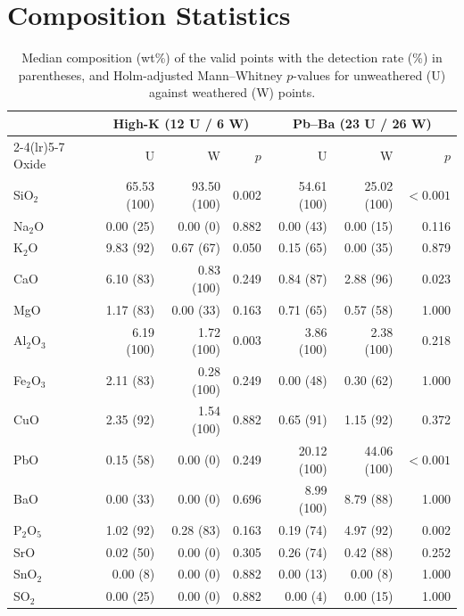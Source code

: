 \documentclass[11pt,a4paper]{article}
\begin{document}
\clearpage
\appendix
\section{Composition Statistics}

\begin{table}[h!]
\centering
\caption{Median composition (wt\%) of the valid points with the detection rate (\%) in parentheses, and Holm-adjusted Mann--Whitney $p$-values for unweathered (U) against weathered (W) points.}\label{tab:compfull}
\small
\begin{tabular}{lrrrrrr}
\toprule
& \multicolumn{3}{c}{High-K (12 U / 6 W)} & \multicolumn{3}{c}{Pb--Ba (23 U / 26 W)}\\
\cmidrule(lr){2-4}\cmidrule(lr){5-7}
Oxide & U & W & $p$ & U & W & $p$ \\
\midrule
SiO$_2$ & 65.53 (100) & 93.50 (100) & 0.002 & 54.61 (100) & 25.02 (100) & $<0.001$ \\
Na$_2$O & 0.00 (25) & 0.00 (0) & 0.882 & 0.00 (43) & 0.00 (15) & 0.116 \\
K$_2$O & 9.83 (92) & 0.67 (67) & 0.050 & 0.15 (65) & 0.00 (35) & 0.879 \\
CaO & 6.10 (83) & 0.83 (100) & 0.249 & 0.84 (87) & 2.88 (96) & 0.023 \\
MgO & 1.17 (83) & 0.00 (33) & 0.163 & 0.71 (65) & 0.57 (58) & 1.000 \\
Al$_2$O$_3$ & 6.19 (100) & 1.72 (100) & 0.003 & 3.86 (100) & 2.38 (100) & 0.218 \\
Fe$_2$O$_3$ & 2.11 (83) & 0.28 (100) & 0.249 & 0.00 (48) & 0.30 (62) & 1.000 \\
CuO & 2.35 (92) & 1.54 (100) & 0.882 & 0.65 (91) & 1.15 (92) & 0.372 \\
PbO & 0.15 (58) & 0.00 (0) & 0.249 & 20.12 (100) & 44.06 (100) & $<0.001$ \\
BaO & 0.00 (33) & 0.00 (0) & 0.696 & 8.99 (100) & 8.79 (88) & 1.000 \\
P$_2$O$_5$ & 1.02 (92) & 0.28 (83) & 0.163 & 0.19 (74) & 4.97 (92) & 0.002 \\
SrO & 0.02 (50) & 0.00 (0) & 0.305 & 0.26 (74) & 0.42 (88) & 0.252 \\
SnO$_2$ & 0.00 (8) & 0.00 (0) & 0.882 & 0.00 (13) & 0.00 (8) & 1.000 \\
SO$_2$ & 0.00 (25) & 0.00 (0) & 0.882 & 0.00 (4) & 0.00 (15) & 1.000 \\
\bottomrule
\end{tabular}
\end{table}
\end{document}
